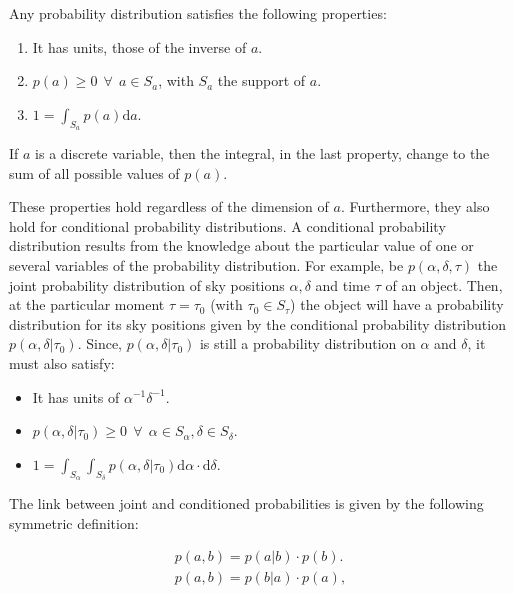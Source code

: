 Any probability distribution satisfies the following properties:

\begin{enumerate}[label={Property \arabic*}]
\item  It has units, those of the inverse of $a$. \label{property:1}
\item $p(a) \geq 0 \ \ \forall \ \ a\in S_a$, with $S_a$ the support of $a$. \label{property:3}
\item $1=\int_{S_a} p(a) \mathrm{d}a$. \label{property:3}
\end{enumerate}

If $a$ is a discrete variable, then the integral, in the last property, change to the sum of all possible values of $p(a)$.

These properties hold regardless of the dimension of $a$. Furthermore, they also hold for conditional probability distributions. A conditional probability distribution results from the knowledge about the particular value of one or several variables of the probability distribution. For example, be $p(\alpha,\delta,\tau)$ the joint probability distribution of sky positions $\alpha,\delta$ and time $\tau$ of an object. Then, at the particular moment $\tau=\tau_0$ (with $\tau_0 \in S_{\tau}$) the object will have a probability distribution for its sky positions given by the conditional probability distribution $p(\alpha,\delta|\tau_0)$. Since, $p(\alpha,\delta|\tau_0)$ is still a probability distribution on $\alpha$ and $\delta$, it must also satisfy:

\begin{itemize}
\item It has units of $\alpha^{-1} \delta^{-1}$.
\item $p(\alpha,\delta|\tau_0)\geq0 \ \ \forall \ \ \alpha\in S_{\alpha}, \delta\in S_{\delta}$. %
\item $1=\int_{S_{\alpha}} \int_{S_{\delta}} p(\alpha,\delta|\tau_0)\mathrm{d}\alpha\cdot \mathrm{d}\delta$.
\end{itemize}

The link between joint and conditioned probabilities is given by the following symmetric definition:

\begin{align}
p(a,b)=p(a|b)\cdot p(b).\nonumber \\
p(a,b)=p(b|a) \cdot p(a),
\end{align}

